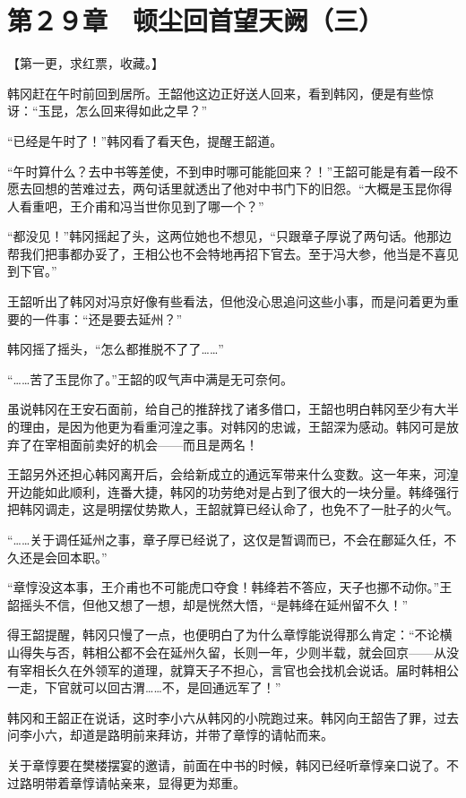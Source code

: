 \section{第２９章　顿尘回首望天阙（三）}

【第一更，求红票，收藏。】

韩冈赶在午时前回到居所。王韶他这边正好送人回来，看到韩冈，便是有些惊讶：“玉昆，怎么回来得如此之早？”

“已经是午时了！”韩冈看了看天色，提醒王韶道。

“午时算什么？去中书等差使，不到申时哪可能能回来？！”王韶可能是有着一段不愿去回想的苦难过去，两句话里就透出了他对中书门下的旧怨。“大概是玉昆你得人看重吧，王介甫和冯当世你见到了哪一个？”

“都没见！”韩冈摇起了头，这两位她也不想见，“只跟章子厚说了两句话。他那边帮我们把事都办妥了，王相公也不会特地再招下官去。至于冯大参，他当是不喜见到下官。”

王韶听出了韩冈对冯京好像有些看法，但他没心思追问这些小事，而是问着更为重要的一件事：“还是要去延州？”

韩冈摇了摇头，“怎么都推脱不了了……”

“……苦了玉昆你了。”王韶的叹气声中满是无可奈何。

虽说韩冈在王安石面前，给自己的推辞找了诸多借口，王韶也明白韩冈至少有大半的理由，是因为他更为看重河湟之事。对韩冈的忠诚，王韶深为感动。韩冈可是放弃了在宰相面前卖好的机会——而且是两名！

王韶另外还担心韩冈离开后，会给新成立的通远军带来什么变数。这一年来，河湟开边能如此顺利，连番大捷，韩冈的功劳绝对是占到了很大的一块分量。韩绛强行把韩冈调走，这是明摆仗势欺人，王韶就算已经认命了，也免不了一肚子的火气。

“……关于调任延州之事，章子厚已经说了，这仅是暂调而已，不会在鄜延久任，不久还是会回本职。”

“章惇没这本事，王介甫也不可能虎口夺食！韩绛若不答应，天子也挪不动你。”王韶摇头不信，但他又想了一想，却是恍然大悟，“是韩绛在延州留不久！”

得王韶提醒，韩冈只慢了一点，也便明白了为什么章惇能说得那么肯定：“不论横山得失与否，韩相公都不会在延州久留，长则一年，少则半载，就会回京——从没有宰相长久在外领军的道理，就算天子不担心，言官也会找机会说话。届时韩相公一走，下官就可以回古渭……不，是回通远军了！”

韩冈和王韶正在说话，这时李小六从韩冈的小院跑过来。韩冈向王韶告了罪，过去问李小六，却道是路明前来拜访，并带了章惇的请帖而来。

关于章惇要在樊楼摆宴的邀请，前面在中书的时候，韩冈已经听章惇亲口说了。不过路明带着章惇请帖亲来，显得更为郑重。

